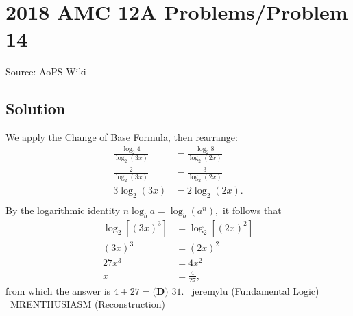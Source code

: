 \documentclass[12pt]{article}
\begin{document}
\section*{{2018 AMC 12A Problems/Problem 14}}
Source: AoPS Wiki

\subsection*{Solution}
We apply the Change of Base Formula, then rearrange: \begin{align*} \frac{\log_2{4}}{\log_2{(3x)}}&=\frac{\log_2{8}}{\log_2{(2x)}} \\ \frac{2}{\log_2{(3x)}}&=\frac{3}{\log_2{(2x)}} \\ 3\log_2{(3x)}&=2\log_2{(2x)}. \\ \end{align*} By the logarithmic identity $n\log_b{a}=\log_b{\left(a^n\right)},$ it follows that \begin{align*} \log_2{\left[(3x)^3\right]}&=\log_2{\left[(2x)^2\right]} \\ (3x)^3&=(2x)^2 \\ 27x^3&=4x^2 \\ x&=\frac{4}{27}, \end{align*} from which the answer is $4+27=\boxed{\textbf{(D) } 31}.$ ~jeremylu (Fundamental Logic) ~MRENTHUSIASM (Reconstruction)
\end{document}
